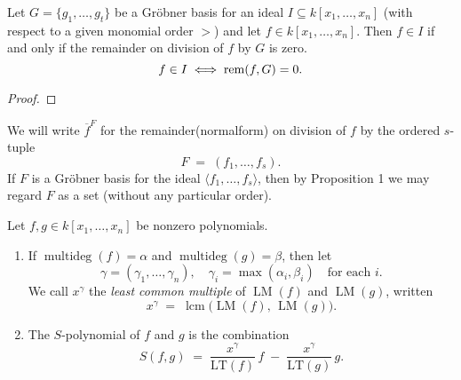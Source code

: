 \begin{corollary}
    \label{cor:GB_membership_test} %
    \leanok
    Let $G = \{g_1, \dots , g_t\}$ be a Gr{\"o}bner basis for an ideal $I \subseteq k[x_1, \dots , x_n]$
    (with respect to a given monomial order $>$) and let $f \in k[x_1, \dots , x_n]$.
    Then $f \in I$ if and only if the remainder on division of $f$ by
    $G$ is zero.
    \[ f \in I \iff \operatorname{rem}(f, G) = 0. \]
\end{corollary}
\begin{proof}
  \leanok %
\end{proof}

\begin{definition}\label{def:Remainder} %
    \leanok %
    We will write \(\overline{f}^F\) for the remainder(normalform) on division of \(f\) by the ordered \(s\)-tuple
    \[
    F \;=\;(f_1,\dots,f_s).
    \]
    If \(F\) is a Gr{\"o}bner basis for the ideal \(\langle f_1,\dots,f_s\rangle\), then by Proposition 1
    we may regard \(F\) as a set (without any particular order).
\end{definition}

\begin{definition}\label{def:S-polynomial} %
    \leanok %
    Let \(f,g\in k[x_1,\dots,x_n]\) be nonzero polynomials.
    \begin{enumerate}
      \item If \(\operatorname{multideg}(f)=\alpha\) and \(\operatorname{multideg}(g)=\beta\), 
        then let 
        \[
          \gamma = (\gamma_1,\dots,\gamma_n),
          \quad
          \gamma_i = \max(\alpha_i,\beta_i)
          \quad\text{for each }i.
        \]
        We call \(x^\gamma\) the \emph{least common multiple} of \(\operatorname{LM}(f)\) and \(\operatorname{LM}(g)\),
        written
        \[
          x^\gamma \;=\;\operatorname{lcm}\bigl(\operatorname{LM}(f),\,\operatorname{LM}(g)\bigr).
        \]
      \item The \(S\)-polynomial of \(f\) and \(g\) is the combination
        \[
          S(f,g)
          \;=\;
          \frac{x^\gamma}{\mathrm{LT}(f)}\,f
          \;-\;
          \frac{x^\gamma}{\mathrm{LT}(g)}\,g.
        \]
    \end{enumerate}
\end{definition}

